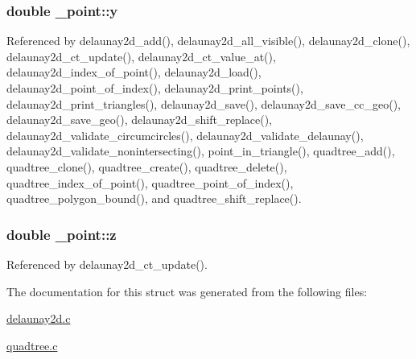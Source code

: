 \subsubsection[{\texorpdfstring{y}{y}}]{\setlength{\rightskip}{0pt plus 5cm}double \+\_\+point\+::y}\hypertarget{struct__point_ad466443e70f7ff7bcb1d2f8fda2c7168}{}\label{struct__point_ad466443e70f7ff7bcb1d2f8fda2c7168}


Referenced by delaunay2d\+\_\+add(), delaunay2d\+\_\+all\+\_\+visible(), delaunay2d\+\_\+clone(), delaunay2d\+\_\+ct\+\_\+update(), delaunay2d\+\_\+ct\+\_\+value\+\_\+at(), delaunay2d\+\_\+index\+\_\+of\+\_\+point(), delaunay2d\+\_\+load(), delaunay2d\+\_\+point\+\_\+of\+\_\+index(), delaunay2d\+\_\+print\+\_\+points(), delaunay2d\+\_\+print\+\_\+triangles(), delaunay2d\+\_\+save(), delaunay2d\+\_\+save\+\_\+cc\+\_\+geo(), delaunay2d\+\_\+save\+\_\+geo(), delaunay2d\+\_\+shift\+\_\+replace(), delaunay2d\+\_\+validate\+\_\+circumcircles(), delaunay2d\+\_\+validate\+\_\+delaunay(), delaunay2d\+\_\+validate\+\_\+nonintersecting(), point\+\_\+in\+\_\+triangle(), quadtree\+\_\+add(), quadtree\+\_\+clone(), quadtree\+\_\+create(), quadtree\+\_\+delete(), quadtree\+\_\+index\+\_\+of\+\_\+point(), quadtree\+\_\+point\+\_\+of\+\_\+index(), quadtree\+\_\+polygon\+\_\+bound(), and quadtree\+\_\+shift\+\_\+replace().

\subsubsection[{\texorpdfstring{z}{z}}]{\setlength{\rightskip}{0pt plus 5cm}double \+\_\+point\+::z}\hypertarget{struct__point_aaf044203a60ed8b17f9a17cbdd08eb25}{}\label{struct__point_aaf044203a60ed8b17f9a17cbdd08eb25}


Referenced by delaunay2d\+\_\+ct\+\_\+update().



The documentation for this struct was generated from the following files\+:\begin{DoxyCompactItemize}
\item 
\hyperlink{delaunay2d_8c}{delaunay2d.\+c}\item 
\hyperlink{quadtree_8c}{quadtree.\+c}\end{DoxyCompactItemize}
